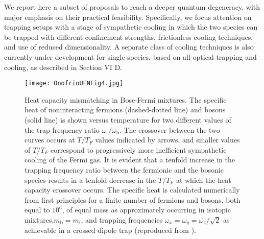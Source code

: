 \documentclass[pra,letterpaper,twocolumn,showpacs,superscriptaddress]{revtex4}
\begin{document}
We report here a subset of proposals to reach a deeper quantum degeneracy, with major emphasis on 
their practical feasibility. Specifically, we focus attention on trapping setups with a stage of 
sympathetic cooling in which the two species can be trapped with different confinement strengths, frictionless 
cooling techniques, and use of reduced dimensionality. A separate class of cooling techniques is also currently under 
development for single species, based on all-optical trapping and cooling, as described in Section VI D.  

\begin{figure}[t]
\texttt{[image: OnofrioUFNFig4.jpg]}
\caption{Heat capacity mismatching in Bose-Fermi mixtures. The specific heat of noninteracting fermions (dashed-dotted line) and bosons 
(solid line) is shown versus temperature for two different values of the trap frequency ratio $\omega_\mathrm{f}/\omega_\mathrm{b}$.
The crossover between the two curves occurs at $T/T_F$ values indicated by arrows, and smaller values of $T/T_F$ correspond to 
progressively more inefficient sympathetic cooling of the Fermi gas. It is evident that a tenfold increase in the trapping frequency ratio 
between the fermionic and the bosonic species results in a tenfold decrease in the $T/T_F$ at which the heat capacity crossover occurs. 
The specific heat is calculated numerically from first principles for a finite number of fermions and bosons, both equal to  $10^6$, of equal 
mass as approximately occurring in isotopic mixtures,$m_\mathrm{b}=m_\mathrm{f}$, and trapping frequencies 
$\omega_x=\omega_y=\omega_z/\sqrt{2}$ as achievable in a crossed dipole trap (reproduced from \cite{Presilla2003}).}
\end{figure}
\end{document}
